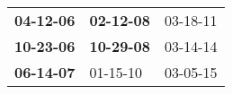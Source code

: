\begin{supertabular}{p{0.33\columnwidth}p{0.33\columnwidth}p{0.33\columnwidth}}
 \textbf{04-12-06\textsuperscript{}} &  \textbf{02-12-08\textsuperscript{}} &  03-18-11\textsuperscript{} \\
 \textbf{10-23-06\textsuperscript{}} &  \textbf{10-29-08\textsuperscript{}} &  03-14-14\textsuperscript{} \\
 \textbf{06-14-07\textsuperscript{}} &           01-15-10\textsuperscript{} &  03-05-15\textsuperscript{} \\
\end{supertabular}
